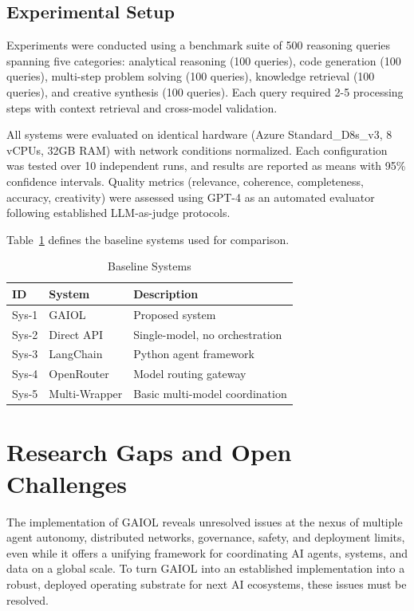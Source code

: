 \documentclass[final,5p,times,twocolumn,authoryear,draft]{elsarticle}
\begin{document}
\subsection{Experimental Setup}

Experiments were conducted using a benchmark suite of 500 reasoning 
queries spanning five categories: analytical reasoning (100 queries), 
code generation (100 queries), multi-step problem solving (100 queries), 
knowledge retrieval (100 queries), and creative synthesis (100 queries). 
Each query required 2-5 processing steps with context retrieval and 
cross-model validation. 

All systems were evaluated on identical hardware (Azure Standard\_D8s\_v3, 
8 vCPUs, 32GB RAM) with network conditions normalized. Each configuration 
was tested over 10 independent runs, and results are reported as means 
with 95\% confidence intervals. Quality metrics (relevance, coherence, 
completeness, accuracy, creativity) were assessed using GPT-4 as an 
automated evaluator following established LLM-as-judge protocols.

Table~\ref{tab:baselines} defines the baseline systems used for comparison.

\begin{table}[h]
\centering
\caption{Baseline Systems}
\label{tab:baselines}
\begin{tabular}{lll}
\hline
ID & System & Description \\
\hline
Sys-1 & GAIOL & Proposed system \\
Sys-2 & Direct API & Single-model, no orchestration \\
Sys-3 & LangChain & Python agent framework \\
Sys-4 & OpenRouter & Model routing gateway \\
Sys-5 & Multi-Wrapper & Basic multi-model coordination \\
\hline
\end{tabular}
\end{table}
\section{Research Gaps and Open Challenges}

The implementation of GAIOL reveals unresolved issues at the nexus of multiple agent autonomy, distributed networks, governance, safety, and deployment limits, even while it offers a unifying framework for coordinating AI agents, systems, and data on a global scale. To turn GAIOL into an established implementation into a robust, deployed operating substrate for next AI ecosystems, these issues must be resolved.
\end{document}
